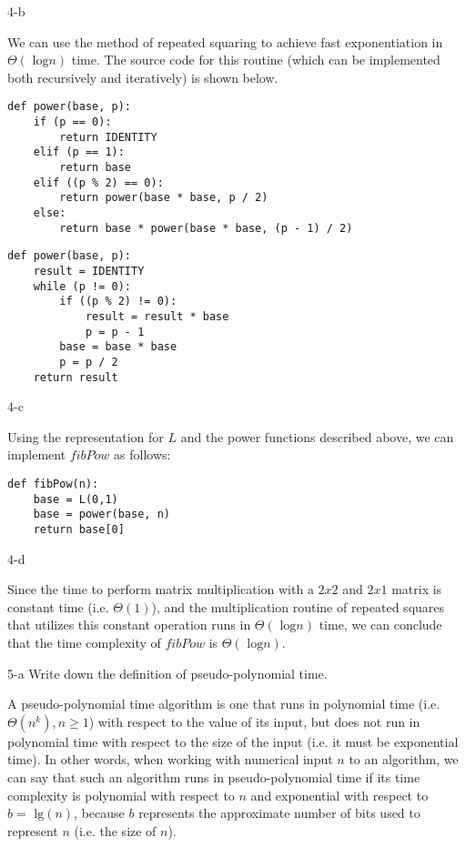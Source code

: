\documentclass[11pt]{article}
\newcommand{\tlg}{\text{ lg}}
\newcommand{\tlog}{\text{ log}}
\begin{document}
\begin{prob}{4-b}
\end{prob}
\begin{sol}

We can use the method of repeated squaring to achieve fast exponentiation in $\Theta(\tlog n)$ time. The source code for this routine (which can be implemented both recursively and iteratively) is shown below.
\begin{lstlisting}
def power(base, p):
	if (p == 0):
		return IDENTITY
	elif (p == 1):
		return base
	elif ((p % 2) == 0):
		return power(base * base, p / 2)
	else:
		return base * power(base * base, (p - 1) / 2)
\end{lstlisting}

\begin{lstlisting}
def power(base, p):
	result = IDENTITY
	while (p != 0):
		if ((p % 2) != 0):
			result = result * base
			p = p - 1
		base = base * base
		p = p / 2
	return result
\end{lstlisting}
\end{sol}

\begin{prob}{4-c}
\end{prob}
\begin{sol}

Using the representation for $L$ and the power functions described above, we can implement $fibPow$ as follows:
\begin{lstlisting}
def fibPow(n):
	base = L(0,1)
	base = power(base, n)
	return base[0]
\end{lstlisting}
\end{sol}

\begin{prob}{4-d}
\end{prob}
\begin{sol}

Since the time to perform matrix multiplication with a $2x2$ and $2x1$ matrix is constant time (i.e. $\Theta(1)$), and the multiplication routine of repeated squares that utilizes this constant operation runs in $\Theta(\tlog n)$ time, we can conclude that the time complexity of $fibPow$ is $\Theta(\tlog n)$.
\end{sol}

\begin{prob}{5-a}
Write down the definition of pseudo-polynomial time.
\end{prob}
\begin{sol}
\begin{define}
A pseudo-polynomial time algorithm is one that runs in polynomial time (i.e. $\Theta(n^{k}), n \geq 1$) with respect to the value of its input, but does not run in polynomial time with respect to the size of the input (i.e. it must be exponential time). In other words, when working with numerical input $n$ to an algorithm, we can say that such an algorithm runs in pseudo-polynomial time if its time complexity is polynomial with respect to $n$ and exponential with respect to $b = \tlg (n)$, because $b$ represents the approximate number of bits used to represent $n$ (i.e. the size of $n$).
\end{define}
\end{sol}
\end{document}
